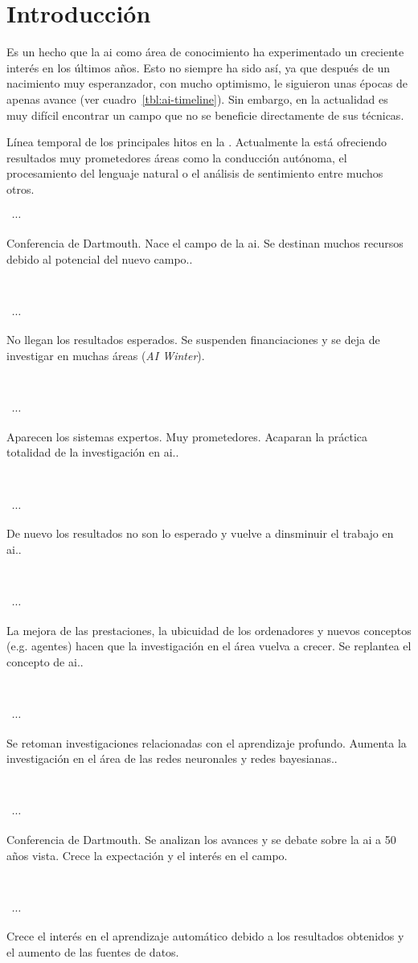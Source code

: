 \chapter{Introducción}
\label{ch:intro}

Es un hecho que la \ac{ai} como área de conocimiento ha experimentado un creciente interés en los últimos años. Esto no siempre ha sido así, ya que después de un nacimiento muy esperanzador, con mucho optimismo, le siguieron unas épocas de apenas avance (ver cuadro~\ref{tbl:ai-timeline}). Sin embargo, en la actualidad es muy difícil encontrar un campo que no se beneficie directamente de sus técnicas.

\begin{margintable}
	\caption{Línea temporal de los principales hitos en la . Actualmente la  está ofreciendo resultados muy prometedores áreas como la conducción autónoma, el procesamiento del lenguaje natural o el análisis de sentimiento entre muchos otros.}
	\label{tbl:ai-timeline}
	\centering
	\begin{minipage}[t]{\linewidth}
		\newcommand\ytl[2]{
			\parbox[b]{1cm}{\hfill{\color{cyan}\bfseries\sffamily #1}~$\cdots$~}
			\parbox[c]{3.8cm}{\vspace{7pt}\raggedright\sffamily #2.\\[0pt]}\\[0pt]}
		\color{gray}

		\ytl{1956}{Conferencia de Dartmouth. Nace el campo de la \ac{ai}. Se destinan muchos recursos debido al potencial del nuevo campo.}
		\ytl{1974}{No llegan los resultados esperados. Se suspenden financiaciones y se deja de investigar en muchas áreas (\textit{AI Winter})}
		\ytl{1980}{Aparecen los sistemas expertos. Muy prometedores. Acaparan la práctica totalidad de la investigación en \ac{ai}.}
		\ytl{1987}{De nuevo los resultados no son lo esperado y vuelve a dinsminuir el trabajo en \ac{ai}.}
		\ytl{1990}{La mejora de las prestaciones, la ubicuidad de los ordenadores y nuevos conceptos (e.g. agentes) hacen que la investigación en el área vuelva a crecer. Se replantea el concepto de \ac{ai}.}
		\ytl{2000}{Se retoman investigaciones relacionadas con el aprendizaje profundo. Aumenta la investigación en el área de las redes neuronales y redes bayesianas.}
		\ytl{2006}{Conferencia de Dartmouth. Se analizan los avances y se debate sobre la \ac{ai} a 50 años vista. Crece la expectación y el interés en el campo}
		\ytl{2007}{Crece el interés en el aprendizaje automático debido a los resultados obtenidos y el aumento de las fuentes de datos}
		\bigskip
	\end{minipage}%
\end{margintable}


